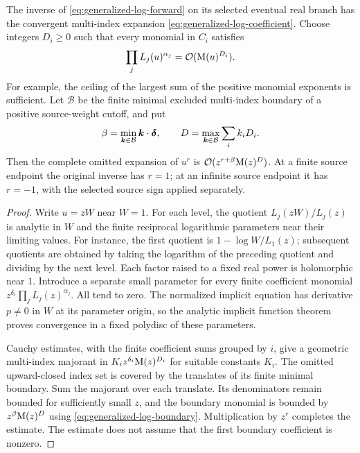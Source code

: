 \begin{theorem}
\label{thm:generalized-log-convergence}
The inverse of \eqref{eq:generalized-log-forward} on its selected eventual
real branch has the convergent multi-index expansion
\eqref{eq:generalized-log-coefficient}. Choose integers $D_i\ge0$ such
that every monomial in $C_i$ satisfies
\[
 \prod_j L_j(u)^{\alpha_j}=\mathcal O(\mathrm M(u)^{D_i}).
\]
For example, the ceiling of the largest sum of the positive monomial
exponents is sufficient. Let $\mathcal B$ be the finite minimal excluded
multi-index boundary of a positive source-weight cutoff, and put
\begin{equation}
 \beta=\min_{\boldsymbol k\in\mathcal B}\boldsymbol k\cdot\boldsymbol\delta,
 \qquad D=\max_{\boldsymbol k\in\mathcal B}\sum_i k_iD_i.
 \label{eq:generalized-log-boundary}
\end{equation}
Then the complete omitted expansion of $u^r$ is
$\mathcal O(z^{r+\beta}\mathrm M(z)^D)$. At a finite source endpoint the original
inverse has $r=1$; at an infinite source endpoint it has $r=-1$,
with the selected source sign applied separately.
\end{theorem}
\begin{proof}
Write $u=zW$ near $W=1$. For each level, the quotient
$L_j(zW)/L_j(z)$ is analytic in $W$ and the finite reciprocal logarithmic
parameters near their limiting values. For instance, the first quotient
is $1-\log W/L_1(z)$; subsequent quotients are obtained by taking the
logarithm of the preceding quotient and dividing by the next level.
Each factor raised to a fixed real power is holomorphic near $1$.
Introduce a separate small parameter for every finite coefficient monomial
$z^{\delta_i}\prod_jL_j(z)^{\alpha_j}$. All tend to zero. The normalized
implicit equation has derivative $p\ne0$ in $W$ at its parameter origin,
so the analytic implicit function theorem proves convergence in a fixed
polydisc of these parameters.

Cauchy estimates, with the finite coefficient sums grouped by $i$, give a
geometric multi-index majorant in
$K_i z^{\delta_i}\mathrm M(z)^{D_i}$ for suitable constants $K_i$.
The omitted upward-closed index set is covered by the translates of its
finite minimal boundary. Sum the majorant over each translate. Its
denominators remain bounded for sufficiently small $z$, and the boundary
monomial is bounded by $z^\beta\mathrm M(z)^D$ using
\eqref{eq:generalized-log-boundary}. Multiplication by $z^r$ completes
the estimate. The estimate does not assume that the first boundary
coefficient is nonzero.
\end{proof}

